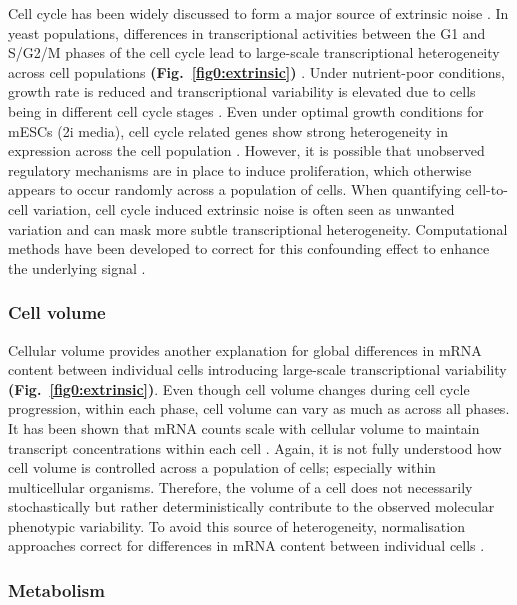 Cell cycle has been widely discussed to form a major source of extrinsic noise \citep{Colman-Lerner2005, Newman2006}. 
In yeast populations, differences in transcriptional activities between the G1 and S/G2/M phases of the cell cycle lead to large-scale transcriptional heterogeneity across cell populations \textbf{(Fig.~\ref{fig0:extrinsic})} \citep{Zopf2013}. 
Under nutrient-poor conditions, growth rate is reduced and transcriptional variability is elevated due to cells being in different cell cycle stages \citep{Keren2015}. 
Even under optimal growth conditions for mESCs (2i media), cell cycle related genes show strong heterogeneity in expression across the cell population \citep{Kolodziejczyk2015cell}. 
However, it is possible that unobserved regulatory mechanisms are in place to induce proliferation, which otherwise appears to occur randomly across a population of cells.
When quantifying cell-to-cell variation, cell cycle induced extrinsic noise is often seen as unwanted variation and can mask more subtle transcriptional heterogeneity. 
Computational methods have been developed to correct for this confounding effect to enhance the underlying signal \citep{Buettner2015, Buettner2017}. 

\subsubsection{Cell volume}

Cellular volume provides another explanation for global differences in mRNA content between individual cells introducing large-scale transcriptional variability \textbf{(Fig.~\ref{fig0:extrinsic})}. 
Even though cell volume changes during cell cycle progression, within each phase, cell volume can vary as much as across all phases. 
It has been shown that mRNA counts scale with cellular volume to maintain transcript concentrations within each cell \citep{Kempe2015, Padovan-Merhar2015, Zhurinsky2010}. 
Again, it is not fully understood how cell volume is controlled across a population of cells; especially within multicellular organisms. 
Therefore, the volume of a cell does not necessarily stochastically but rather deterministically contribute to the observed molecular phenotypic variability.
To avoid this source of heterogeneity, normalisation approaches correct for differences in mRNA content between individual cells \citep{Vallejos2017}.

\subsubsection{Metabolism}

